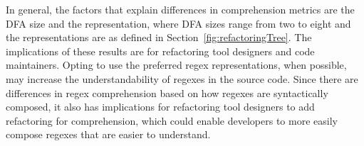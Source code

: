 In general, the factors that explain differences in comprehension metrics are the DFA size and the representation, where DFA sizes range from two to eight and the representations are as defined in Section~\ref{fig:refactoringTree}.
The implications of these results are for refactoring tool designers and code maintainers. Opting to use the preferred regex representations, when possible, may increase the understandability of regexes in the source code.
Since there are differences in regex comprehension based on how regexes are syntactically composed, it also has implications for refactoring tool designers to add refactoring for comprehension, which could enable developers to more easily compose regexes that are easier to understand.
%
%
%
%

